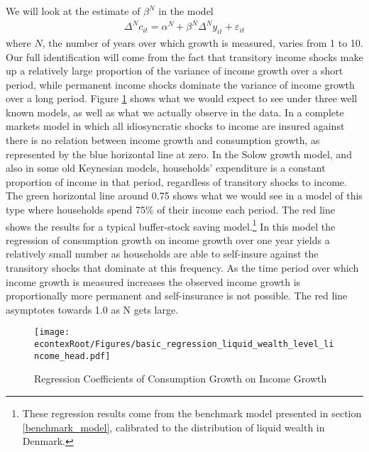 \documentclass[titlepage]{\econtex}\newcommand{\texname}{ConsumptionHeterogeneity}
\begin{document}
We will look at the estimate of $\beta^N$ in the model
\begin{align*}
    \Delta^N c_{it} = \alpha^N + \beta^N \Delta^N y_{it} + \varepsilon_{it}
\end{align*}
where $N$, the number of years over which growth is measured, varies from 1 to 10. Our full identification will come from the fact that transitory income shocks make up a relatively large proportion of the variance of income growth over a short period, while permanent income shocks dominate the variance of income growth over a long period. Figure \ref{fig:GrowthReg} shows what we would expect to see under three well known models, as well as what we actually observe in the data. In a complete markets model in which all idiosyncratic shocks to income are insured against there is no relation between income growth and consumption growth, as represented by the blue horizontal line at zero. In the Solow growth model, and also in some old Keynesian models, households' expenditure is a constant proportion of income in that period, regardless of transitory shocks to income. The green horizontal line around 0.75 shows what we would see in a model of this type where households spend 75\% of their income each period. The red line shows the results for a typical buffer-stock saving model.\footnote{These regression results come from the benchmark model presented in section \ref{benchmark_model}, calibrated to the distribution of liquid wealth in Denmark.} In this model the regression of consumption growth on income growth over one year yields a relatively small number as households are able to self-insure against the transitory shocks that dominate at this frequency. As the time period over which income growth is measured increases the observed income growth is proportionally more permanent and self-insurance is not possible. The red line asymptotes towards 1.0 as N gets large.
	\begin{figure} 
	\begin{centering}
		\texttt{[image: \\econtexRoot/Figures/basic\_regression\_liquid\_wealth\_level\_lincome\_head.pdf]}
		\caption{Regression Coefficients of Consumption Growth on Income Growth}
		\label{fig:GrowthReg}
	\end{centering}
\end{figure}
\end{document}
